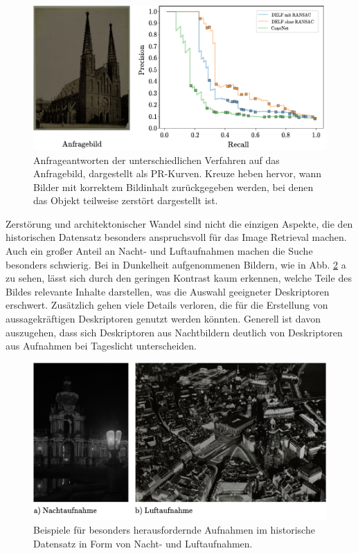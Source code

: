 \\
\begin{figure}[h]
\centering
\includegraphics[scale=1.0]{destruction_pr}
\caption{Anfrageantworten der unterschiedlichen Verfahren auf das Anfragebild, dargestellt als PR-Kurven. Kreuze heben hervor, wann Bilder mit korrektem Bildinhalt zurückgegeben werden, bei denen das Objekt teilweise zerstört dargestellt ist.}
\label{destruction_pr}
\end{figure}
Zerstörung und architektonischer Wandel sind nicht die einzigen Aspekte, die den historischen Datensatz besonders anspruchsvoll für das Image Retrieval machen. Auch ein großer Anteil an Nacht- und Luftaufnahmen machen die Suche besonders schwierig. Bei in Dunkelheit aufgenommenen Bildern, wie in Abb. \ref{example_night_aerial} a zu sehen, lässt sich durch den geringen Kontrast kaum erkennen, welche Teile des Bildes relevante Inhalte darstellen, was die Auswahl geeigneter Deskriptoren erschwert. Zusätzlich gehen viele Details verloren, die für die Erstellung von aussagekräftigen Deskriptoren genutzt werden könnten. Generell ist davon auszugehen, dass sich Deskriptoren aus Nachtbildern deutlich von Deskriptoren aus Aufnahmen bei Tageslicht unterscheiden. 
\begin{figure}[h]
\centering
\includegraphics[scale=1.0]{example_night_aerial}
\caption{Beispiele für besonders herausfordernde Aufnahmen im historische Datensatz in Form von Nacht- und Luftaufnahmen.}
\label{example_night_aerial}
\end{figure}

